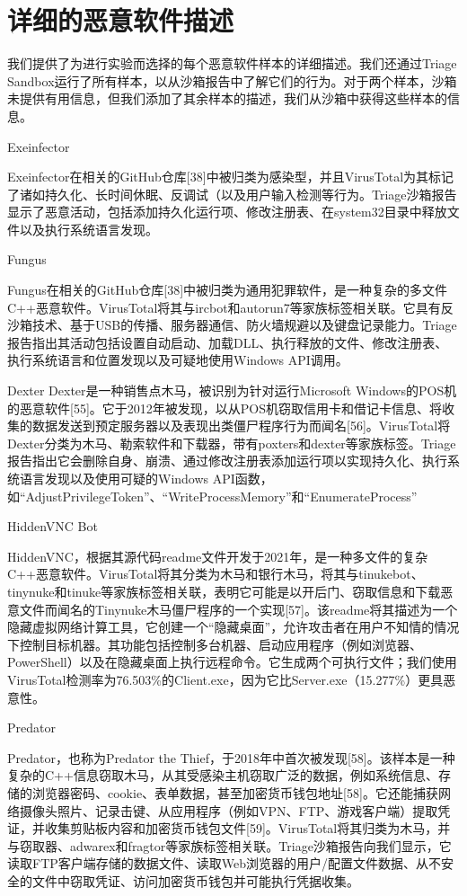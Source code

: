 \chapter{详细的恶意软件描述}
我们提供了为进行实验而选择的每个恶意软件样本的详细描述。我们还通过Triage Sandbox运行了所有样本，以从沙箱报告中了解它们的行为。对于两个样本，沙箱未提供有用信息，但我们添加了其余样本的描述，我们从沙箱中获得这些样本的信息。

Exeinfector

Exeinfector在相关的GitHub仓库[38]中被归类为感染型，并且VirusTotal为其标记了诸如持久化、长时间休眠、反调试（以及用户输入检测等行为。Triage沙箱报告显示了恶意活动，包括添加持久化运行项、修改注册表、在system32目录中释放文件以及执行系统语言发现。

Fungus

Fungus在相关的GitHub仓库[38]中被归类为通用犯罪软件，是一种复杂的多文件C++恶意软件。VirusTotal将其与ircbot和autorun7等家族标签相关联。它具有反沙箱技术、基于USB的传播、服务器通信、防火墙规避以及键盘记录能力。Triage报告指出其活动包括设置自动启动、加载DLL、执行释放的文件、修改注册表、执行系统语言和位置发现以及可疑地使用Windows API调用。

Dexter
Dexter是一种销售点木马，被识别为针对运行Microsoft Windows的POS机的恶意软件[55]。它于2012年被发现，以从POS机窃取信用卡和借记卡信息、将收集的数据发送到预定服务器以及表现出类僵尸程序行为而闻名[56]。VirusTotal将Dexter分类为木马、勒索软件和下载器，带有poxters和dexter等家族标签。Triage报告指出它会删除自身、崩溃、通过修改注册表添加运行项以实现持久化、执行系统语言发现以及使用可疑的Windows API函数，如“AdjustPrivilegeToken”、“WriteProcessMemory”和“EnumerateProcess”

HiddenVNC Bot

HiddenVNC，根据其源代码readme文件开发于2021年，是一种多文件的复杂C++恶意软件。VirusTotal将其分类为木马和银行木马，将其与tinukebot、tinynuke和tinuke等家族标签相关联，表明它可能是以开后门、窃取信息和下载恶意文件而闻名的Tinynuke木马僵尸程序的一个实现[57]。该readme将其描述为一个隐藏虚拟网络计算工具，它创建一个“隐藏桌面”，允许攻击者在用户不知情的情况下控制目标机器。其功能包括控制多台机器、启动应用程序（例如浏览器、PowerShell）以及在隐藏桌面上执行远程命令。它生成两个可执行文件；我们使用VirusTotal检测率为76.503\%的Client.exe，因为它比Server.exe（15.277\%）更具恶意性。

Predator

Predator，也称为Predator the Thief，于2018年中首次被发现[58]。该样本是一种复杂的C++信息窃取木马，从其受感染主机窃取广泛的数据，例如系统信息、存储的浏览器密码、cookie、表单数据，甚至加密货币钱包地址[58]。它还能捕获网络摄像头照片、记录击键、从应用程序（例如VPN、FTP、游戏客户端）提取凭证，并收集剪贴板内容和加密货币钱包文件[59]。VirusTotal将其归类为木马，并与窃取器、adwarex和fragtor等家族标签相关联。Triage沙箱报告向我们显示，它读取FTP客户端存储的数据文件、读取Web浏览器的用户/配置文件数据、从不安全的文件中窃取凭证、访问加密货币钱包并可能执行凭据收集。

